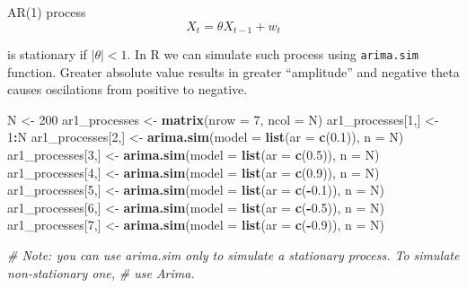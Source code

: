 \documentclass[]{article}
\newenvironment{Shaded}{\begin{snugshade}}{\end{snugshade}}
\newcommand{\CommentTok}[1]{\textcolor[rgb]{0.56,0.35,0.01}{\textit{#1}}}
\newcommand{\DataTypeTok}[1]{\textcolor[rgb]{0.13,0.29,0.53}{#1}}
\newcommand{\DecValTok}[1]{\textcolor[rgb]{0.00,0.00,0.81}{#1}}
\newcommand{\FloatTok}[1]{\textcolor[rgb]{0.00,0.00,0.81}{#1}}
\newcommand{\KeywordTok}[1]{\textcolor[rgb]{0.13,0.29,0.53}{\textbf{#1}}}
\newcommand{\NormalTok}[1]{#1}
\newcommand{\OperatorTok}[1]{\textcolor[rgb]{0.81,0.36,0.00}{\textbf{#1}}}
\newcommand{\StringTok}[1]{\textcolor[rgb]{0.31,0.60,0.02}{#1}}
\begin{document}
AR(1) process \[X_t = \theta X_{t-1} + w_t\]

is stationary if \(|\theta| < 1\). In R we can simulate such process
using \texttt{arima.sim} function. Greater absolute value results in
greater ``amplitude'' and negative theta causes oscilations from
positive to negative.

\begin{Shaded}
\begin{Highlighting}[]
\NormalTok{N <-}\StringTok{ }\DecValTok{200}
\NormalTok{ar1_processes <-}\StringTok{ }\KeywordTok{matrix}\NormalTok{(}\DataTypeTok{nrow =} \DecValTok{7}\NormalTok{, }\DataTypeTok{ncol =}\NormalTok{ N)}
\NormalTok{ar1_processes[}\DecValTok{1}\NormalTok{,] <-}\StringTok{ }\DecValTok{1}\OperatorTok{:}\NormalTok{N}
\NormalTok{ar1_processes[}\DecValTok{2}\NormalTok{,] <-}\StringTok{ }\KeywordTok{arima.sim}\NormalTok{(}\DataTypeTok{model =} \KeywordTok{list}\NormalTok{(}\DataTypeTok{ar =} \KeywordTok{c}\NormalTok{(}\FloatTok{0.1}\NormalTok{)), }\DataTypeTok{n =}\NormalTok{ N)}
\NormalTok{ar1_processes[}\DecValTok{3}\NormalTok{,] <-}\StringTok{ }\KeywordTok{arima.sim}\NormalTok{(}\DataTypeTok{model =} \KeywordTok{list}\NormalTok{(}\DataTypeTok{ar =} \KeywordTok{c}\NormalTok{(}\FloatTok{0.5}\NormalTok{)), }\DataTypeTok{n =}\NormalTok{ N)}
\NormalTok{ar1_processes[}\DecValTok{4}\NormalTok{,] <-}\StringTok{ }\KeywordTok{arima.sim}\NormalTok{(}\DataTypeTok{model =} \KeywordTok{list}\NormalTok{(}\DataTypeTok{ar =} \KeywordTok{c}\NormalTok{(}\FloatTok{0.9}\NormalTok{)), }\DataTypeTok{n =}\NormalTok{ N)}
\NormalTok{ar1_processes[}\DecValTok{5}\NormalTok{,] <-}\StringTok{ }\KeywordTok{arima.sim}\NormalTok{(}\DataTypeTok{model =} \KeywordTok{list}\NormalTok{(}\DataTypeTok{ar =} \KeywordTok{c}\NormalTok{(}\OperatorTok{-}\FloatTok{0.1}\NormalTok{)), }\DataTypeTok{n =}\NormalTok{ N)}
\NormalTok{ar1_processes[}\DecValTok{6}\NormalTok{,] <-}\StringTok{ }\KeywordTok{arima.sim}\NormalTok{(}\DataTypeTok{model =} \KeywordTok{list}\NormalTok{(}\DataTypeTok{ar =} \KeywordTok{c}\NormalTok{(}\OperatorTok{-}\FloatTok{0.5}\NormalTok{)), }\DataTypeTok{n =}\NormalTok{ N)}
\NormalTok{ar1_processes[}\DecValTok{7}\NormalTok{,] <-}\StringTok{ }\KeywordTok{arima.sim}\NormalTok{(}\DataTypeTok{model =} \KeywordTok{list}\NormalTok{(}\DataTypeTok{ar =} \KeywordTok{c}\NormalTok{(}\OperatorTok{-}\FloatTok{0.9}\NormalTok{)), }\DataTypeTok{n =}\NormalTok{ N)}

\CommentTok{# Note: you can use arima.sim only to simulate a stationary process. To simulate non-stationary one,}
\CommentTok{# use Arima.}


\end{Highlighting}
\end{Shaded}
\end{document}
